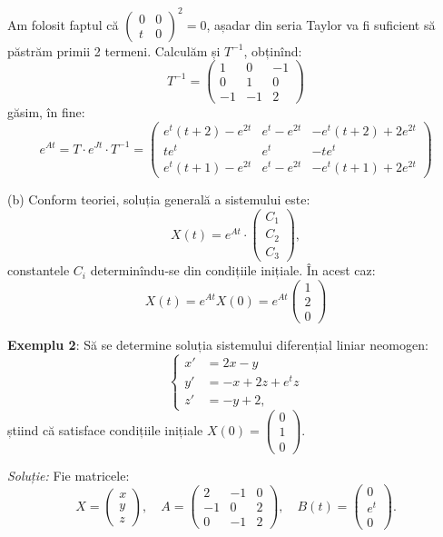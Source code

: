 Am folosit faptul că $\begin{pmatrix} 0 & 0 \\ t & 0 \end{pmatrix}^2 = 0$, așadar
din seria Taylor va fi suficient să păstrăm primii 2 termeni. Calculăm și $T^{-1}$,
obținînd:
\[
  T^{-1} = \begin{pmatrix}
    1 & 0 & -1 \\
    0 & 1 & 0 \\
    -1 & -1 & 2
  \end{pmatrix}
\]
găsim, în fine:
\[
  e^{At} = T \cdot e^{Jt} \cdot T^{-1} =
  \begin{pmatrix}
    e^t(t + 2) - e^{2t} & e^t - e^{2t} & -e^t(t + 2) + 2e^{2t} \\
    te^t & e^t & -te^t \\
    e^t(t + 1) - e^{2t} & e^t - e^{2t} & -e^t(t + 1) + 2e^{2t}
  \end{pmatrix}
\]

(b) Conform teoriei, soluția generală a sistemului este:
\[
  X(t) = e^{At} \cdot \begin{pmatrix}
    C_1 \\ C_2 \\ C_3
  \end{pmatrix},
\]
constantele $C_i$ determinîndu-se din condițiile inițiale. În acest caz:
\[
  X(t) = e^{At} X(0) = e^{At}
  \begin{pmatrix}
    1 \\ 2 \\ 0 
  \end{pmatrix}
\]

\vspace{2cm}

\textbf{Exemplu 2}: Să se determine soluția sistemului diferențial liniar neomogen:
\[
  \begin{cases}
    x' &= 2x - y \\
    y' &= -x + 2z + e^t z \\
    z' &= -y + 2,
  \end{cases}
\]
știind că satisface condițiile inițiale $X(0) = \begin{pmatrix} 0 \\ 1 \\ 0 \end{pmatrix}$.

\emph{Soluție:} Fie matricele:
\[
  X = \begin{pmatrix}
    x \\ y \\ z 
  \end{pmatrix}, \quad
  A = \begin{pmatrix}
    2 & -1 & 0 \\
    -1 & 0 & 2 \\
    0 & -1 & 2 
  \end{pmatrix}, \quad
  B(t) = \begin{pmatrix}
    0 \\ e^t \\ 0
  \end{pmatrix}.
\]

